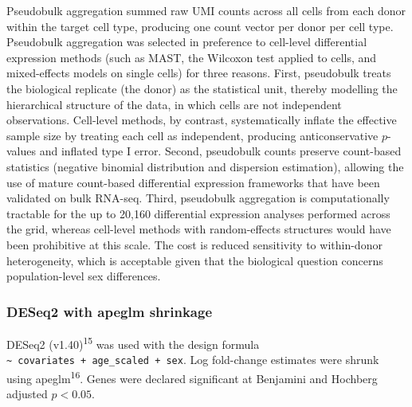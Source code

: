 \documentclass[
]{article}
\begin{document}
Pseudobulk aggregation summed raw UMI counts across all cells from each
donor within the target cell type, producing one count vector per donor
per cell type. Pseudobulk aggregation was selected in preference to
cell-level differential expression methods (such as MAST, the Wilcoxon
test applied to cells, and mixed-effects models on single cells) for
three reasons. First, pseudobulk treats the biological replicate (the
donor) as the statistical unit, thereby modelling the hierarchical
structure of the data, in which cells are not independent observations.
Cell-level methods, by contrast, systematically inflate the effective
sample size by treating each cell as independent, producing
anticonservative \(p\)-values and inflated type I error. Second,
pseudobulk counts preserve count-based statistics (negative binomial
distribution and dispersion estimation), allowing the use of mature
count-based differential expression frameworks that have been validated
on bulk RNA-seq. Third, pseudobulk aggregation is computationally
tractable for the up to 20,160 differential expression analyses
performed across the grid, whereas cell-level methods with
random-effects structures would have been prohibitive at this scale. The
cost is reduced sensitivity to within-donor heterogeneity, which is
acceptable given that the biological question concerns population-level
sex differences.

\subsubsection{DESeq2 with apeglm
shrinkage}\label{deseq2-with-apeglm-shrinkage}

DESeq2 (v1.40)\textsuperscript{15} was used with the design formula
\texttt{\textasciitilde{}\ covariates\ +\ age\_scaled\ +\ sex}. Log
fold-change estimates were shrunk using apeglm\textsuperscript{16}.
Genes were declared significant at Benjamini and Hochberg adjusted
\(p < 0.05\).
\end{document}

